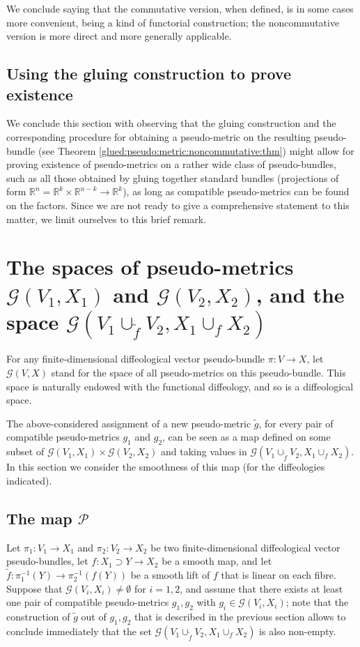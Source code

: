 \documentclass{article}
\newcommand\matR{{\mathbb{R}}}
\begin{document}
We conclude saying that the commutative version, when defined, is in some cases more convenient, being a kind of functorial construction; the noncommutative version is more direct and more generally
applicable.


\subsection{Using the gluing construction to prove existence}

We conclude this section with observing that the gluing construction and the corresponding procedure for obtaining a pseudo-metric on the resulting pseudo-bundle (see Theorem
\ref{glued:pseudo:metric:noncommutative:thm}) might allow for proving existence of pseudo-metrics on a rather wide class of pseudo-bundles, such as all those obtained by gluing together standard bundles 
(projections of form $\matR^n=\matR^k\times\matR^{n-k}\to\matR^k$), as long as compatible pseudo-metrics can be found on the factors. Since we are not ready to give a comprehensive statement to this 
matter, we limit ourselves to this brief remark.



\section{The spaces of pseudo-metrics $\mathcal{G}(V_1,X_1)$ and $\mathcal{G}(V_2,X_2)$, and the space $\mathcal{G}(V_1\cup_{\tilde{f}}V_2,X_1\cup_f X_2)$}

For any finite-dimensional diffeological vector pseudo-bundle $\pi:V\to X$, let $\mathcal{G}(V,X)$ stand for the space of all pseudo-metrics on this pseudo-bundle. This space is naturally endowed with the 
functional diffeology, and so is a diffeological space.

The above-considered assignment of a new pseudo-metric $\tilde{g}$, for every pair of compatible pseudo-metrics $g_1$ and $g_2$, can be seen as a map defined on some subset of
$\mathcal{G}(V_1,X_1)\times\mathcal{G}(V_2,X_2)$ and taking values in $\mathcal{G}(V_1\cup_{\tilde{f}}V_2,X_1\cup_f X_2)$. In this section we consider the smoothness of this map (for the diffeologies
indicated).


\subsection{The map $\mathcal{P}$}

Let $\pi_1:V_1\to X_1$ and $\pi_2:V_2\to X_2$ be two finite-dimensional diffeological vector pseudo-bundles, let $f:X_1\supset Y\to X_2$ be a smooth map, and let $\tilde{f}:\pi_1^{-1}(Y)\to\pi_2^{-1}(f(Y))$ be 
a smooth lift of $f$ that is linear on each fibre. Suppose that $\mathcal{G}(V_i,X_i)\neq\emptyset$ for $i=1,2$, and assume that there exists at least one pair of compatible pseudo-metrics $g_1,g_2$ with 
$g_i\in\mathcal{G}(V_i,X_i)$; note that the construction of $\tilde{g}$ out of $g_1,g_2$ that is described in the previous section allows to conclude immediately that the set 
$\mathcal{G}(V_1\cup_{\tilde{f}}V_2,X_1\cup_f X_2)$ is also non-empty.
\end{document}

